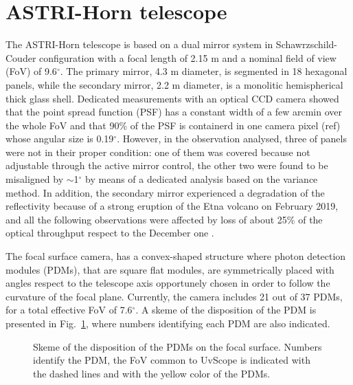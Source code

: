 \section{ASTRI-Horn telescope} 
The ASTRI-Horn telescope is based on a dual mirror system in Schawrzschild-Couder configuration
with a focal length of 2.15 m and a nominal field of view (FoV) of 9.6$^\circ$. 
The primary mirror, 4.3 m diameter, is segmented in 18 hexagonal panels, 
while the secondary mirror, 2.2 m diameter, is a monolitic hemispherical thick glass shell. 
Dedicated measurements  with an optical CCD camera showed that the
point spread function (PSF) has a constant width of a few arcmin
over the whole FoV and that  90\% of the PSF  is containerd in one camera pixel (ref)
whose angular size is 0.19$^\circ$. 
However, in the observation analysed, three of panels were not in their proper condition:
one of them was covered because not adjustable through the active mirror control, the other two were found to be misaligned by $\sim$1$^\circ$ by means of a dedicated analysis based on the variance method.
In addition, the secondary mirror experienced a degradation of the reflectivity because of a strong eruption of the Etna volcano on February 2019, and all the following observations were affected by loss of about 25\% of the optical throughput
respect to the December one \cite{Mineo2019}. 

The focal surface camera, has a convex-shaped structure where
photon detection modules (PDMs), that are square flat modules, are symmetrically placed
with angles respect to the telescope axis opportunely chosen in order to follow the curvature of the focal plane.
Currently, the camera includes 21 out of 37 PDMs, for a total effective FoV of 7.6$^\circ$.
A skeme of the disposition of the PDM is presented in Fig.~\ref{fig:camera}, where numbers identifying each PDM are also indicated. 
\begin{figure}
\caption{Skeme of the disposition of the PDMs on the focal surface. Numbers identify the PDM, the FoV common to UvScope is indicated with the dashed lines and with the yellow color of the PDMs.}
\label{fig:camera}
\end{figure}

